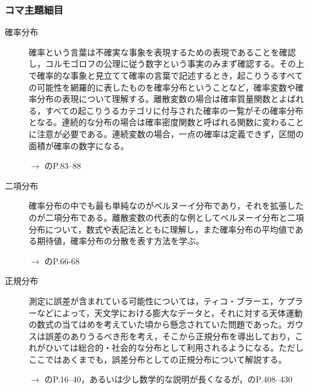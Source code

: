 \subsubsection{コマ主題細目}
\begin{description}


	\item[確率分布]確率という言葉は不確実な事象を表現するための表現であることを確認し，コルモゴロフの公理に従う数字という事実のみまず確認する。その上で確率的な事象と見立てて確率の言葉で記述するとき，起こりうるすべての可能性を網羅的に表したものを確率分布ということなど，確率変数や確率分布の表現について理解する。離散変数の場合は確率質量関数とよばれる，すべての起こりうるカテゴリに付与された確率の一覧がその確率分布となる。連続的な分布の場合は確率密度関数と呼ばれる関数に変わることに注意が必要である。連続変数の場合，一点の確率は定義できず，区間の面積が確率の数字になる。
	      \begin{flushright}
		      $\to$ \textcite{Maeda2017}のP.83--88
	      \end{flushright}

	\item[二項分布]確率分布の中でも最も単純なのがベルヌーイ分布であり，それを拡張したのが二項分布である。離散変数の代表的な例としてベルヌーイ分布と二項分布について，数式や表記法とともに理解し，また確率分布の平均値である期待値，確率分布の分散を表す方法を学ぶ。
	      \begin{flushright}
		      $\to$ \textcite{Nojima201903}のP.66-68
	      \end{flushright}

	\item[正規分布]測定に誤差が含まれている可能性については，ティコ・ブラーエ，ケプラーなどによって，天文学における膨大なデータと，それに対する天体運動の数式の当てはめを考えていた頃から懸念されていた問題であった。ガウスは誤差のありうるべき形を考え，そこから正規分布を導出しており，これがひいては総合的・社会的な分布として利用されるようになる。ただしここではあくまでも，誤差分布としての正規分布について解説する。
	      \begin{flushright}
		      $\to$ \textcite{Naganuma2201611}のP.16--40，あるいは少し数学的な説明が長くなるが，\textcite{Nishiuchi201712}のP.408--430
	      \end{flushright}


\end{description}
